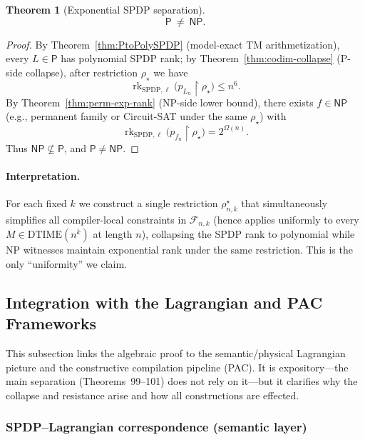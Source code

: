 \documentclass[12pt]{article}
\newtheorem{theorem}{Theorem}
\theoremstyle{definition}
\theoremstyle{definition}
\theoremstyle{remark}
\theoremstyle{remark}
\begin{document}
\begin{theorem}[Exponential SPDP separation]\label{thm:exp-spdp-sep}
\[
\mathsf{P}\ \neq\ \mathsf{NP}.
\]
\end{theorem}

\begin{proof}
By Theorem~\ref{thm:PtoPolySPDP} (model-exact TM arithmetization), every $L\in\mathsf{P}$ has polynomial SPDP rank; by Theorem~\ref{thm:codim-collapse} (P-side collapse), after restriction $\rho_\star$ we have
\[
\operatorname{rk}_{\mathrm{SPDP},\ell}\!\big(p_{L_n}\!\upharpoonright\rho_\star\big)\le n^6.
\]
By Theorem~\ref{thm:perm-exp-rank} (NP-side lower bound), there exists $f\in\mathsf{NP}$ (e.g., permanent family or Circuit-SAT under the same $\rho_\star$) with
\[
\operatorname{rk}_{\mathrm{SPDP},\ell}\!\big(p_{f_n}\!\upharpoonright\rho_\star\big)=2^{\Omega(n)}.
\]
Thus $\mathsf{NP}\not\subseteq\mathsf{P}$, and $\mathsf{P}\neq\mathsf{NP}$.
\end{proof}

\paragraph{Interpretation.} For each fixed $k$ we construct a single restriction $\rho^\star_{n,k}$ that simultaneously
simplifies all compiler-local constraints in $\mathcal{F}_{n,k}$ (hence applies uniformly to every
$M\in\mathrm{DTIME}(n^k)$ at length $n$), collapsing the SPDP rank to polynomial while NP witnesses maintain exponential rank under the same restriction. This is the only ``uniformity'' we claim.

\subsection{Integration with the Lagrangian and PAC Frameworks}

This subsection links the algebraic proof to the semantic/physical Lagrangian picture and the constructive compilation pipeline (PAC). It is expository---the main separation (Theorems~99--101) does not rely on it---but it clarifies why the collapse and resistance arise and how all constructions are effected.

\subsubsection{SPDP--Lagrangian correspondence (semantic layer)}
\end{document}
